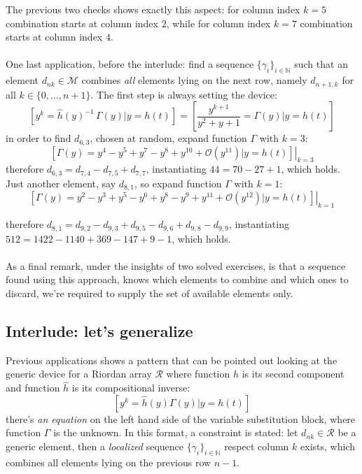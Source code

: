 The previous two checks shows exactly this aspect: for column index $k=5$
combination starts at column index $2$, while for column index $k=7$ combination
starts at column index $4$.
\\\\
One last application, before the interlude: 
find a sequence $\lbrace \gamma_{i} \rbrace_{i\in\mathbb{N}}$ such that 
an element $d_{nk}\in\mathcal{M}$ combines \emph{all} elements lying on 
the next row, namely $d_{n+1,k}$ for all $k\in\lbrace0,\ldots,n+1\rbrace$.
The first step is always setting the device:
\begin{displaymath}
    \left[y^{k} = \hat{h}(y)^{-1}\,\Gamma(y) \big| y = h(t) \right]=
        \left[ \frac{y^{k + 1}}{y^2 + y + 1} = \Gamma(y) \big| y = h(t) \right]
\end{displaymath}
in order to find $d_{6,3}$, chosen at random, expand function $\Gamma$ with $k=3$:
\begin{displaymath}
    \left.\left[\Gamma(y)=y^4 -y^5 + y^7 -y^8 +y^{10} + \mathcal{O}(y^{11}) 
        \big| y = h(t) \right]\right|_{k=3}
\end{displaymath}
therefore $d_{6,3}=d_{7,4} - d_{7,5} + d_{7,7}$, instantiating $44 = 70 -27 +1$, 
which holds. Just another element, say $d_{8,1}$, so expand function 
$\Gamma$ with $k=1$:
\begin{displaymath}
    \left.\left[\Gamma(y)=y^2 -y^3 + y^5 -y^6 + y^8 -y^9 + y^{11} + 
        \mathcal{O}(y^{12}) \big| y = h(t) \right]\right|_{k=1}
\end{displaymath}

therefore $d_{8,1}=d_{9,2} - d_{9,3} + d_{9,5}- d_{9,6}+ d_{9,8}- d_{9,9}$, 
instantiating $512 = 1422 -1140 +369 -147 +9 -1$, which holds.
\\\\
As a final remark, under the insights of two solved exercises, is that a
sequence found using this approach, knows which elements to combine and which
ones to discard, we're required to supply the set of available elements only.


\subsection{Interlude: let's generalize}
\label{subsec:sequences:interluce:generalization}

Previous applications shows a pattern that can be pointed out looking at 
the generic device for a Riordan array $\mathcal{R}$ where 
function $h$ is its second component and function $\hat{h}$ 
is its compositional inverse:
\begin{displaymath}
    \left[y^{k} = \hat{h}(y) \Gamma(y) \big| y = h(t) \right]
\end{displaymath}
there's \emph{an equation} on the left hand side of the variable substitution block, 
where function $\Gamma$ is the unknown. In this format, 
a constraint is stated: let $d_{nk}\in\mathcal{R}$ be a generic element, 
then a \emph{localized} sequence 
$\lbrace \gamma_{i} \rbrace_{i\in\mathbb{N}}$ respect column $k$ exists, which
combines all elements lying on the previous row $n-1$.

